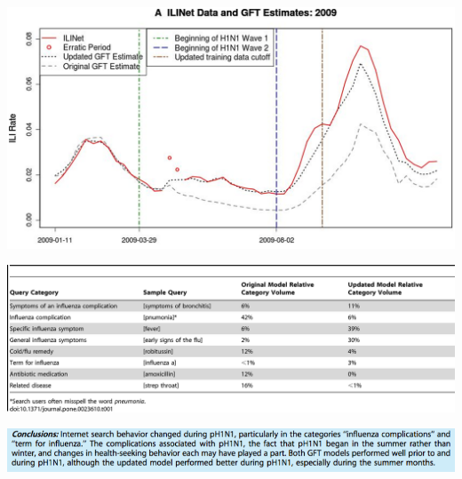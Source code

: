 \documentclass[aspectratio=169]{beamer}
\begin{document}
\begin{frame}

\begin{center}
\includegraphics[width=\textwidth]{figures/cook_assessing_2011_fig2a}
\end{center}

\end{frame}
\begin{frame}

\begin{center}
\includegraphics[width=\textwidth]{figures/cook_assessing_2011_tab1}
\end{center}

\end{frame}
\begin{frame}

\begin{center}
\includegraphics[width=\textwidth]{figures/cook_assessing_2011_conclusion}
\end{center}

\end{frame}
\end{document}
